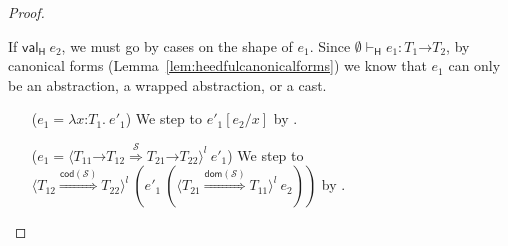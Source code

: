 \documentclass[9pt]{extarticle}
\newcommand{\ottnt}[1]{\mathit{#1}}
\newcommand{\ottsym}[1]{#1}
\begin{document}
{\begin{lemma}
\begin{proof}
{\begin{itemize}
      If $ \mathsf{val} _{  \mathsf{H}  }~ \ottnt{e_{{\mathrm{2}}}} $, we must go by cases on the shape of
      $\ottnt{e_{{\mathrm{1}}}}$. Since $ \emptyset   \vdash _{  \mathsf{H}  }  \ottnt{e_{{\mathrm{1}}}}  :   \ottnt{T_{{\mathrm{1}}}} \mathord{ \rightarrow } \ottnt{T_{{\mathrm{2}}}}  $, by canonical forms
      (Lemma~\ref{lem:heedfulcanonicalforms}) we know that $\ottnt{e_{{\mathrm{1}}}}$ can only
      be an abstraction, a wrapped abstraction, or a cast.
\begin{itemize}
      \item[($\ottnt{e_{{\mathrm{1}}}}  \ottsym{=}   \lambda \mathit{x} \mathord{:} \ottnt{T_{{\mathrm{1}}}} .~  \ottnt{e'_{{\mathrm{1}}}} $)] We step to $ \ottnt{e'_{{\mathrm{1}}}}  [  \ottnt{e_{{\mathrm{2}}}} / \mathit{x}  ] $ by
        .

      \item[($\ottnt{e_{{\mathrm{1}}}}  \ottsym{=}   \langle   \ottnt{T_{{\mathrm{11}}}} \mathord{ \rightarrow } \ottnt{T_{{\mathrm{12}}}}   \mathord{ \overset{ \mathcal{S} }{\Rightarrow} }   \ottnt{T_{{\mathrm{21}}}} \mathord{ \rightarrow } \ottnt{T_{{\mathrm{22}}}}   \rangle^{ \ottnt{l} } ~  \ottnt{e'_{{\mathrm{1}}}} $)] We step to
        $ \langle  \ottnt{T_{{\mathrm{12}}}}  \mathord{ \overset{  \mathsf{cod} ( \mathcal{S} )  }{\Rightarrow} }  \ottnt{T_{{\mathrm{22}}}}  \rangle^{ \ottnt{l} } ~   (  \ottnt{e'_{{\mathrm{1}}}} ~  (  \langle  \ottnt{T_{{\mathrm{21}}}}  \mathord{ \overset{  \mathsf{dom} ( \mathcal{S} )  }{\Rightarrow} }  \ottnt{T_{{\mathrm{11}}}}  \rangle^{ \ottnt{l} } ~  \ottnt{e_{{\mathrm{2}}}}  )   )  $ by
        .
      \end{itemize}


\end{itemize}}
\end{proof}
\end{lemma}}
\end{document}
